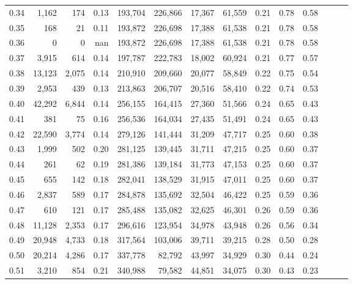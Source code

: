 \begin{tabular}{rrrrrrrrrrrrrr}
0.34 &   1,162 &    174 &  0.13 &  193,704 &  226,866 &  17,367 &  61,559 &  0.21 &  0.78 &      0.58 \\
0.35 &     168 &     21 &  0.11 &  193,872 &  226,698 &  17,388 &  61,538 &  0.21 &  0.78 &      0.58 \\
0.36 &       0 &      0 &   nan &  193,872 &  226,698 &  17,388 &  61,538 &  0.21 &  0.78 &      0.58 \\
0.37 &   3,915 &    614 &  0.14 &  197,787 &  222,783 &  18,002 &  60,924 &  0.21 &  0.77 &      0.57 \\
0.38 &  13,123 &  2,075 &  0.14 &  210,910 &  209,660 &  20,077 &  58,849 &  0.22 &  0.75 &      0.54 \\
0.39 &   2,953 &    439 &  0.13 &  213,863 &  206,707 &  20,516 &  58,410 &  0.22 &  0.74 &      0.53 \\
0.40 &  42,292 &  6,844 &  0.14 &  256,155 &  164,415 &  27,360 &  51,566 &  0.24 &  0.65 &      0.43 \\
0.41 &     381 &     75 &  0.16 &  256,536 &  164,034 &  27,435 &  51,491 &  0.24 &  0.65 &      0.43 \\
0.42 &  22,590 &  3,774 &  0.14 &  279,126 &  141,444 &  31,209 &  47,717 &  0.25 &  0.60 &      0.38 \\
0.43 &   1,999 &    502 &  0.20 &  281,125 &  139,445 &  31,711 &  47,215 &  0.25 &  0.60 &      0.37 \\
0.44 &     261 &     62 &  0.19 &  281,386 &  139,184 &  31,773 &  47,153 &  0.25 &  0.60 &      0.37 \\
0.45 &     655 &    142 &  0.18 &  282,041 &  138,529 &  31,915 &  47,011 &  0.25 &  0.60 &      0.37 \\
0.46 &   2,837 &    589 &  0.17 &  284,878 &  135,692 &  32,504 &  46,422 &  0.25 &  0.59 &      0.36 \\
0.47 &     610 &    121 &  0.17 &  285,488 &  135,082 &  32,625 &  46,301 &  0.26 &  0.59 &      0.36 \\
0.48 &  11,128 &  2,353 &  0.17 &  296,616 &  123,954 &  34,978 &  43,948 &  0.26 &  0.56 &      0.34 \\
0.49 &  20,948 &  4,733 &  0.18 &  317,564 &  103,006 &  39,711 &  39,215 &  0.28 &  0.50 &      0.28 \\
0.50 &  20,214 &  4,286 &  0.17 &  337,778 &   82,792 &  43,997 &  34,929 &  0.30 &  0.44 &      0.24 \\
0.51 &   3,210 &    854 &  0.21 &  340,988 &   79,582 &  44,851 &  34,075 &  0.30 &  0.43 &      0.23 \\

\end{tabular}
